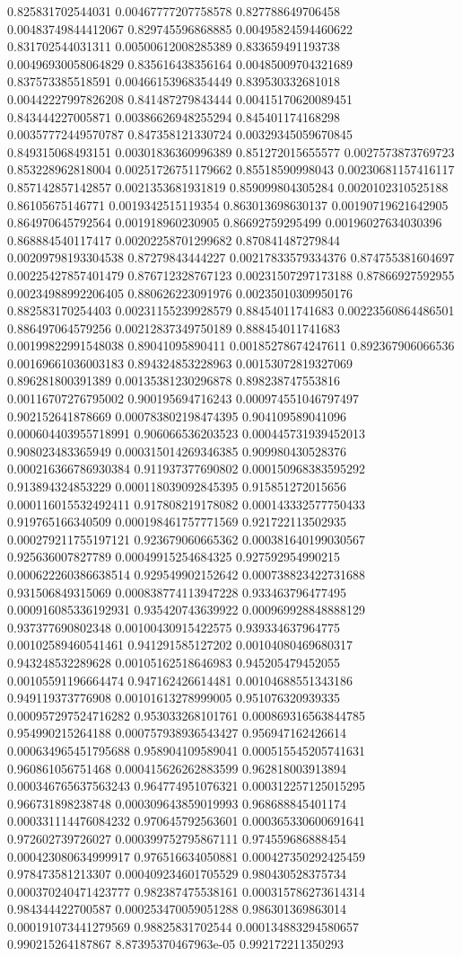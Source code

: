 \begin{table}
\begin{tabu}
\begin{sparkline}{10}
0.825831702544031 0.00467777207758578 0.827788649706458 0.00483749844412067 0.829745596868885 0.00495824594460622 0.831702544031311 0.00500612008285389 0.833659491193738 0.00496930058064829 0.835616438356164 0.00485009704321689 0.837573385518591 0.00466153968354449 0.839530332681018 0.00442227997826208 0.841487279843444 0.00415170620089451 0.843444227005871 0.00386626948255294 0.845401174168298 0.00357772449570787 0.847358121330724 0.00329345059670845 0.849315068493151 0.00301836360996389 0.851272015655577 0.0027573873769723 0.853228962818004 0.00251726751179662 0.85518590998043 0.00230681157416117 0.857142857142857 0.0021353681931819 0.859099804305284 0.0020102310525188 0.86105675146771 0.0019342515119354 0.863013698630137 0.00190719621642905 0.864970645792564 0.001918960230905 0.86692759295499 0.00196027634030396 0.868884540117417 0.00202258701299682 0.870841487279844 0.00209798193304538 0.87279843444227 0.00217833579334376 0.874755381604697 0.00225427857401479 0.876712328767123 0.00231507297173188 0.87866927592955 0.00234988992206405 0.880626223091976 0.00235010309950176 0.882583170254403 0.00231155239928579 0.88454011741683 0.00223560864486501 0.886497064579256 0.00212837349750189 0.888454011741683 0.00199822991548038 0.89041095890411 0.00185278674247611 0.892367906066536 0.00169661036003183 0.894324853228963 0.00153072819327069 0.896281800391389 0.00135381230296878 0.898238747553816 0.00116707276795002 0.900195694716243 0.000974551046797497 0.902152641878669 0.000783802198474395 0.904109589041096 0.000604403955718991 0.906066536203523 0.000445731939452013 0.908023483365949 0.000315014269346385 0.909980430528376 0.000216366786930384 0.911937377690802 0.000150968383595292 0.913894324853229 0.000118039092845395 0.915851272015656 0.000116015532492411 0.917808219178082 0.000143332577750433 0.919765166340509 0.000198461757771569 0.921722113502935 0.000279211755197121 0.923679060665362 0.000381640199030567 0.925636007827789 0.00049915254684325 0.927592954990215 0.000622260386638514 0.929549902152642 0.000738823422731688 0.931506849315069 0.000838774113947228 0.933463796477495 0.000916085336192931 0.935420743639922 0.000969928848888129 0.937377690802348 0.00100430915422575 0.939334637964775 0.00102589460541461 0.941291585127202 0.00104080469680317 0.943248532289628 0.00105162518646983 0.945205479452055 0.00105591196664474 0.947162426614481 0.00104688551343186 0.949119373776908 0.00101613278999005 0.951076320939335 0.000957297524716282 0.953033268101761 0.000869316563844785 0.954990215264188 0.000757938936543427 0.956947162426614 0.000634965451795688 0.958904109589041 0.000515545205741631 0.960861056751468 0.000415626262883599 0.962818003913894 0.000346765637563243 0.964774951076321 0.000312257125015295 0.966731898238748 0.000309643859019993 0.968688845401174 0.000331114476084232 0.970645792563601 0.000365330600691641 0.972602739726027 0.000399752795867111 0.974559686888454 0.000423080634999917 0.976516634050881 0.000427350292425459 0.978473581213307 0.000409234601705529 0.980430528375734 0.000370240471423777 0.982387475538161 0.000315786273614314 0.984344422700587 0.000253470059051288 0.986301369863014 0.000191073441279569 0.98825831702544 0.000134883294580657 0.990215264187867 8.87395370467963e-05 0.992172211350293 
\end{sparkline}
\end{tabu}
\end{table}
